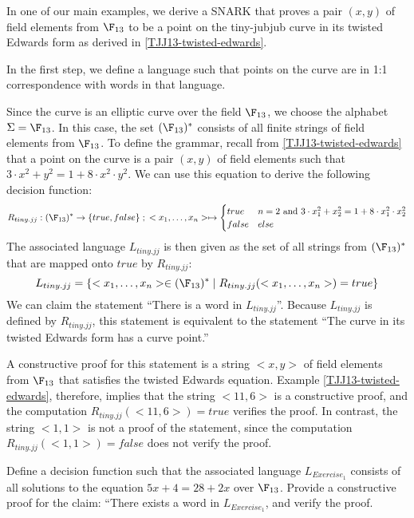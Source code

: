 \begin{example}\label{ex:tiny-jubjub} In one of our main examples, we derive a SNARK that proves a pair $(x,y)$ of field elements from $\F_{13}$ to be a point on the tiny-{jubjub} curve in its twisted Edwards form as derived in \examplename{} \ref{TJJ13-twisted-edwards}.

In the first step, we define a language such that points on the  curve are in 1:1 correspondence with words in that language.

Since the  curve is an elliptic curve over the field $\F_{13}$, we choose the alphabet $\Sigma = \F_{13}$. In this case, the set $(\F_{13})^*$ consists of all finite strings of field elements from $\F_{13}$. To define the grammar, recall from \eqref{TJJ13-twisted-edwards} that a point on the  curve is a pair $(x,y)$ of field elements such that $3\cdot x^2 + y^2 = 1+ 8\cdot x^2\cdot y^2$. We can use this equation to derive the following decision function:
$$
R_{tiny.jj} : (\F_{13})^* \to \{true, false\}\;;\;
<x_1,\ldots,x_n> \mapsto
\begin{cases}
true & n=2 \text{ and } 3\cdot x_1^2 + x_2^2 = 1+ 8\cdot x_1^2\cdot x_2^2\\
false & else
\end{cases}
$$
The associated language $L_{tiny.jj}$ is then given as the set of all strings from $(\F_{13})^*$ that are mapped onto $true$ by $R_{tiny.jj}$:
$$
L_{tiny.jj} = \{<x_1,\ldots,x_n>\in (\F_{13})^*\;|\; R_{tiny.jj}(<x_1,\ldots,x_n>)=true \}
$$
We can claim the statement ``There is a word in $L_{tiny.jj}$''. Because $L_{tiny.jj}$ is defined by $R_{tiny.jj}$, this statement is equivalent to the statement ``The  curve in its twisted Edwards form has a curve point.'' 

A constructive proof for this statement is a string $<x,y>$ of field elements from $\F_{13}$ that satisfies the twisted Edwards equation. Example \eqref{TJJ13-twisted-edwards}, therefore, implies that the string $<11,6>$ is a constructive proof, and the computation $R_{tiny.jj}(<11,6>)=true$ verifies the proof. In contrast, the string $<1,1>$ is not a proof of the statement, since the computation $R_{tiny.jj}(<1,1>)=false$ does not verify the proof.
\end{example}
\begin{exercise}
\label{ex:decision_function_1} Define a decision function such that the associated language $L_{Exercise_1}$ consists of all solutions to the equation $5x + 4 = 28 + 2x$ over $\F_{13}$. Provide a constructive proof for the claim: ``There exists a word in $L_{Exercise_1}$, and verify the proof.  
\end{exercise}
